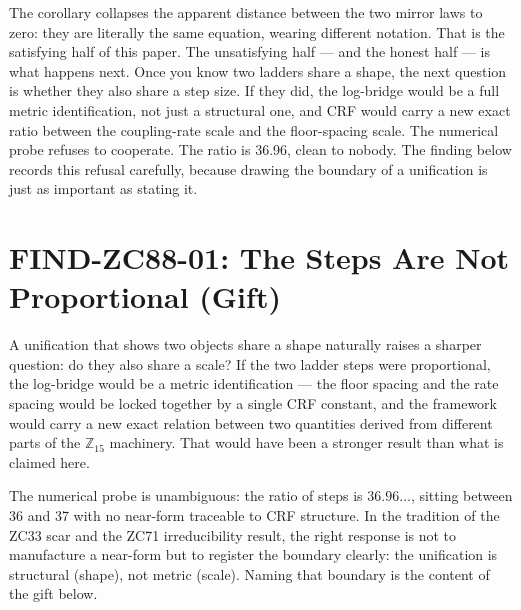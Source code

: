 \documentclass[12pt, a4paper]{article}
\begin{document}
The corollary collapses the apparent distance between the two mirror laws to
zero: they are literally the same equation, wearing different notation.
That is the satisfying half of this paper. The unsatisfying half --- and the
honest half --- is what happens next. Once you know two ladders share a
shape, the next question is whether they also share a step size. If they did,
the log-bridge would be a full metric identification, not just a structural
one, and CRF would carry a new exact ratio between the coupling-rate scale
and the floor-spacing scale. The numerical probe refuses to cooperate. The
ratio is 36.96, clean to nobody. The finding below records this refusal
carefully, because drawing the boundary of a unification is just as
important as stating it.

\section{FIND-ZC88-01: The Steps Are Not Proportional (Gift)}
\label{sec:find-zc88}

A unification that shows two objects share a shape naturally raises a
sharper question: do they also share a scale? If the two ladder steps were
proportional, the log-bridge would be a metric identification --- the floor
spacing and the rate spacing would be locked together by a single CRF
constant, and the framework would carry a new exact relation between two
quantities derived from different parts of the $\mathbb{Z}_{15}$ machinery.
That would have been a stronger result than what is claimed here.

The numerical probe is unambiguous: the ratio of steps is $36.96\ldots$,
sitting between 36 and 37 with no near-form traceable to CRF structure. In
the tradition of the ZC33 scar and the ZC71 irreducibility result, the
right response is not to manufacture a near-form but to register the
boundary clearly: the unification is structural (shape), not metric (scale).
Naming that boundary is the content of the gift below.

\end{document}
